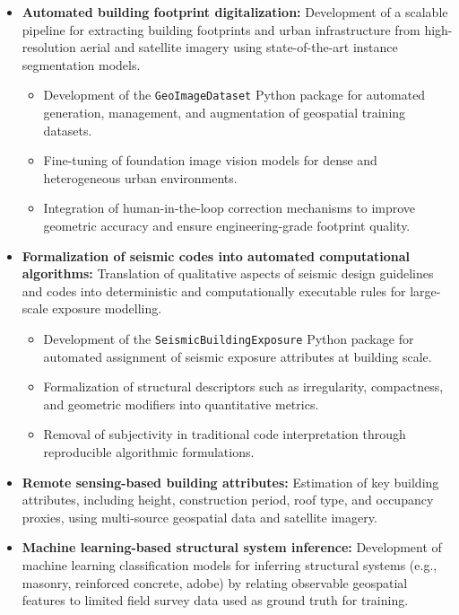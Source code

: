 \begin{itemize}

    \item \textbf{Automated building footprint digitalization:} 
    Development of a scalable pipeline for extracting building footprints and urban infrastructure from high-resolution aerial and satellite imagery using state-of-the-art instance segmentation models.
    \begin{itemize}
        \item Development of the \texttt{GeoImageDataset} Python package for automated generation, management, and augmentation of geospatial training datasets.
        \item Fine-tuning of foundation image vision models for dense and heterogeneous urban environments.
        \item Integration of human-in-the-loop correction mechanisms to improve geometric accuracy and ensure engineering-grade footprint quality.
    \end{itemize}

    \item \textbf{Formalization of seismic codes into automated computational algorithms:}
    Translation of qualitative aspects of seismic design guidelines and codes into deterministic and computationally executable rules for large-scale exposure modelling.
    \begin{itemize}
        \item Development of the \texttt{SeismicBuildingExposure} Python package for automated assignment of seismic exposure attributes at building scale.
        \item Formalization of structural descriptors such as irregularity, compactness, and geometric modifiers into quantitative metrics.
        \item Removal of subjectivity in traditional code interpretation through reproducible algorithmic formulations.
    \end{itemize}

    \item \textbf{Remote sensing-based building attributes:}
    Estimation of key building attributes, including height, construction period, roof type, and occupancy proxies, using multi-source geospatial data and satellite imagery.

    \item \textbf{Machine learning-based structural system inference:}
    Development of machine learning classification models for inferring structural systems (e.g., masonry, reinforced concrete, adobe) by relating observable geospatial features to limited field survey data used as ground truth for training.
    

\end{itemize}
